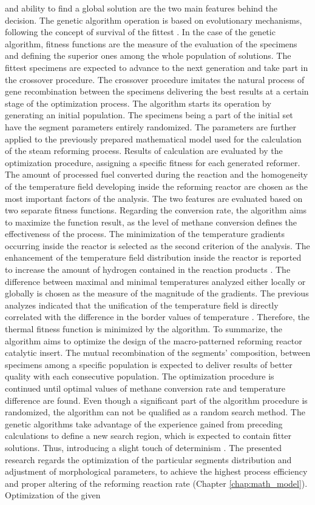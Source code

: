 and ability to find a global solution are the two main features behind the decision. The genetic algorithm operation is based on evolutionary mechanisms, following the concept of survival of the fittest \cite{Goldberg1989}. In the case of the genetic algorithm, fitness functions are the measure of the evaluation of the specimens and defining the superior ones among the whole population of solutions. The fittest specimens are expected to advance to the next generation and take part in the crossover procedure. The crossover procedure imitates the natural process of gene recombination between the specimens delivering the best results at a certain stage of the optimization process. The algorithm starts its operation by generating an initial population. The specimens being a part of the initial set have the segment parameters entirely randomized. The parameters are further applied to the previously prepared mathematical model used for the calculation of the steam reforming process. Results of   calculation are evaluated by the optimization procedure, assigning a specific fitness for each generated reformer. The amount of processed fuel converted during the reaction and the homogeneity of the temperature field developing inside the reforming reactor are chosen as the most important factors of the analysis. The two features are evaluated based on two separate fitness functions. Regarding the conversion rate, the algorithm aims to maximize the function result, as the level of methane conversion defines the effectiveness of the process. The minimization of the temperature gradients occurring inside the reactor is selected as the second criterion of the analysis. The enhancement of the temperature field distribution inside the reactor is reported to increase the amount of hydrogen contained in the reaction products \cite{Palma2017}. The difference between maximal and minimal temperatures analyzed either locally or globally is chosen as the measure of the magnitude of the gradients.  The previous analyzes indicated that the unification of the temperature field is directly correlated with the difference in the border values of temperature \cite{Pajak2018}. Therefore, the thermal fitness function is minimized by the algorithm. To summarize, the algorithm aims to optimize the design of the macro-patterned reforming reactor catalytic insert. The mutual recombination of the segments’ composition, between specimens among a specific population is expected to deliver results of better quality with each consecutive population. The optimization procedure is continued until optimal values of methane conversion rate and temperature difference are found. Even though a significant part of the algorithm procedure is randomized, the algorithm can not be qualified as a random search method. The genetic algorithms take advantage of the experience gained from preceding calculations to define a new search region, which is expected to contain fitter solutions. Thus, introducing a slight touch of determinism \cite{Goldberg1989}. The presented research regards the optimization of the particular segments distribution and adjustment of morphological parameters, to achieve the highest process efficiency and proper altering of the reforming reaction rate (Chapter \ref{chap:math_model}). Optimization of the given 